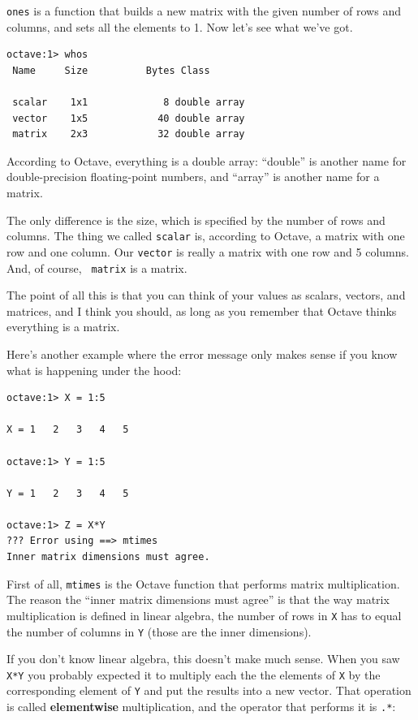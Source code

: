 \documentclass{book}
\begin{document}
{\tt ones} is a function that builds a new matrix with the given
number of rows and columns, and sets all the elements to 1.
Now let's see what we've got.

\begin{verbatim}
octave:1> whos
 Name     Size          Bytes Class

 scalar    1x1             8 double array
 vector    1x5            40 double array
 matrix    2x3            32 double array
\end{verbatim}

According to Octave, everything is a double array: ``double''
is another name for double-precision floating-point numbers,
and ``array'' is another name for a matrix.

The only difference is the size, which is specified by the number of
rows and columns. The thing we called {\tt scalar} is, according to
Octave, a matrix with one row and one column. Our {\tt vector} is
really a matrix with one row and 5 columns. And, of course, {\tt
matrix} is a matrix.

The point of all this is that you can think of your values as
scalars, vectors, and matrices, and I think you should, as long
as you remember that Octave thinks everything is a matrix.

Here's another example where the error message only makes sense
if you know what is happening under the hood:

\begin{verbatim}
octave:1> X = 1:5

X = 1   2   3   4   5

octave:1> Y = 1:5

Y = 1   2   3   4   5

octave:1> Z = X*Y
??? Error using ==> mtimes
Inner matrix dimensions must agree.
\end{verbatim}

First of all, {\tt mtimes} is the Octave function that performs
matrix multiplication. The reason the ``inner matrix dimensions
must agree'' is that the way matrix multiplication is defined in
linear algebra, the number of rows in {\tt X} has to equal the
number of columns in {\tt Y} (those are the inner dimensions).

If you don't know linear algebra, this doesn't make much sense.
When you saw {\tt X*Y} you probably expected it to multiply each
the the elements of {\tt X} by the corresponding element of
{\tt Y} and put the results into a new vector. That operation
is called {\bf elementwise} multiplication, and the operator that
performs it is {\tt .*}:
\end{document}
